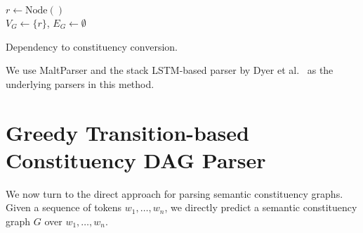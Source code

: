 \documentclass[11pt]{article}
\begin{document}
\begin{algorithm}
 $r \leftarrow \mathrm{Node()}$\\
 $V_G \leftarrow \{r\}$,
 $E_G \leftarrow \emptyset$\\
 \caption{Dependency to constituency conversion.}
 \label{alg:dep2con}
\end{algorithm}

We use MaltParser \cite{nivre2007maltparser} and the stack LSTM-based parser by Dyer et al.~ as the underlying parsers in this method.

\section{Greedy Transition-based Constituency DAG Parser}\label{sec:direct_approach}

We now turn to the direct approach for parsing semantic constituency graphs. Given a sequence of tokens $w_1, \ldots, w_n$, we directly predict a semantic constituency graph $G$ over $w_1, \ldots, w_n$.

\end{document}
